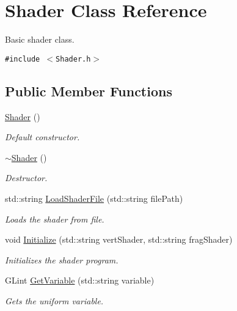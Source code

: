 \hypertarget{class_shader}{
\section{Shader Class Reference}
\label{class_shader}
}
Basic shader class.  


{\tt \#include $<$Shader.h$>$}

\subsection*{Public Member Functions}
\begin{CompactItemize}
\item 
\hyperlink{class_shader_0d654ebaca4e0555197c0724c6d30610}{Shader} ()
\begin{CompactList}\small\item\em Default constructor. \item\end{CompactList}\item 
\hyperlink{class_shader_ff01df87e8a102f270b5b135a295e59d}{$\sim$Shader} ()
\begin{CompactList}\small\item\em Destructor. \item\end{CompactList}\item 
std::string \hyperlink{class_shader_c843ecd8274ea7507df0edf2f4e6a794}{LoadShaderFile} (std::string filePath)
\begin{CompactList}\small\item\em Loads the shader from file. \item\end{CompactList}\item 
void \hyperlink{class_shader_750cae45b47ecb6d8b8ae334562e7c6f}{Initialize} (std::string vertShader, std::string fragShader)
\begin{CompactList}\small\item\em Initializes the shader program. \item\end{CompactList}\item 
GLint \hyperlink{class_shader_1230582b9f5d71bde3614683244e1a83}{GetVariable} (std::string variable)
\begin{CompactList}\small\item\em Gets the uniform variable. \item\end{CompactList}\item 

\end{CompactItemize}
